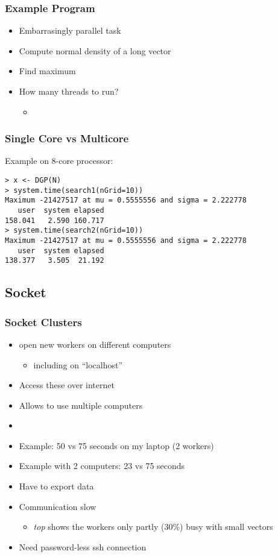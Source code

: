 \documentclass[pdftex]{beamer}
\begin{document}
\begin{frame}
  \frametitle{Example Program}
  \begin{itemize}
  \item Embarrasingly parallel task
  \item Compute normal density of a long vector
  \item Find maximum
  \item How many threads to run?
    \begin{itemize}
    \item {}
    \end{itemize}
  \end{itemize}
\end{frame}

\begin{frame}[fragile]
  \frametitle{Single Core vs Multicore }
  Example on 8-core processor: 
\begin{lstlisting}
> x <- DGP(N)
> system.time(search1(nGrid=10))
Maximum -21427517 at mu = 0.5555556 and sigma = 2.222778 
   user  system elapsed 
158.041   2.590 160.717 
> system.time(search2(nGrid=10))
Maximum -21427517 at mu = 0.5555556 and sigma = 2.222778 
   user  system elapsed 
138.377   3.505  21.192 
\end{lstlisting}
  
\end{frame}

\subsection{Socket}

\begin{frame}
  \frametitle{Socket Clusters}
  \begin{itemize}
  \item open new workers on different computers
    \begin{itemize}
    \item including on ``localhost''
    \end{itemize}
  \item Access these over internet
  \item Allows to use multiple computers
  \item {}
  \item Example: 50 vs 75 seconds on my laptop (2 workers)
  \item Example with 2 computers: 23 vs 75 seconds
    \pause
  \item Have to export data
  \item Communication slow
    \begin{itemize}
    \item \emph{top} shows the workers only partly (30\%) busy with
      small vectors
    \end{itemize}
  \item Need password-less ssh connection
  \end{itemize}
\end{frame}
\end{document}
